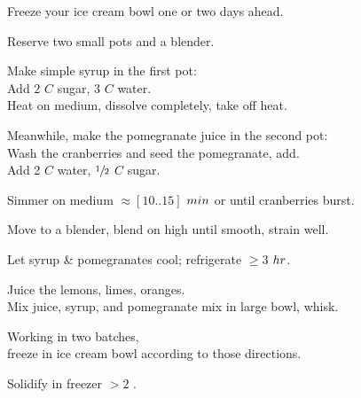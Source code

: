 \begin{preparation}
\item Freeze your ice cream bowl one or two days ahead.
\item Reserve two small pots and a blender.
\item Make simple syrup in the first pot:\\
    Add $2$ $C$ sugar, 3 $C$ water.\\
    Heat on medium, dissolve completely, take off heat.
\item Meanwhile, make the pomegranate juice in the second pot:\\
    Wash the cranberries and seed the pomegranate, add.\\
    Add 2 $C$ water, $\onehalf$ $C$ sugar.
\item Simmer on medium $\approx [10..15]$ $\minute$ or until cranberries burst.
\item Move to a blender, blend on high until smooth, strain well.
\item Let syrup \& pomegranates cool; refrigerate $\ge3$ $\hour$.
\item Juice the lemons, limes, oranges.\\
    Mix juice, syrup, and pomegranate mix in large bowl, whisk.
\item Working in two batches, \\freeze in ice cream bowl according to those directions.
\item Solidify in freezer $>2$ \hour.
\end{preparation}

\recipeend%
